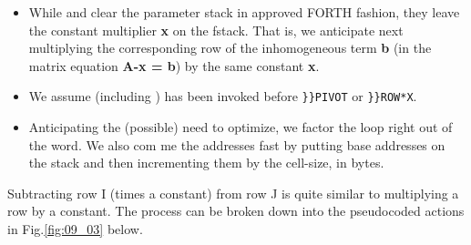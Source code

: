 \begin{itemize}
    \item  While  and  clear the parameter stack in approved FORTH fashion, they leave the constant
        multiplier \textbf{x} on the fstack. That is, we anticipate next multiplying the corresponding row of the inhomogeneous term \textbf{b} (in
        the matrix equation \textbf{A-x = b}) by the same constant \textbf{x}.
    \item We assume  (including ) has been
        invoked before \verb|}}PIVOT| or \verb|}}ROW*X|.
  \item Anticipating the (possible) need to optimize, we factor the loop
right out of the word. We also com me the addresses fast by
putting base addresses on the stack and then incrementing
them by the cell-size, in bytes.
\end{itemize}


Subtracting row I (times a constant) from row J is quite similar to
multiplying a row by a constant. The process can be broken down
into the pseudocoded actions in Fig.\ref{fig:09_03} below.

